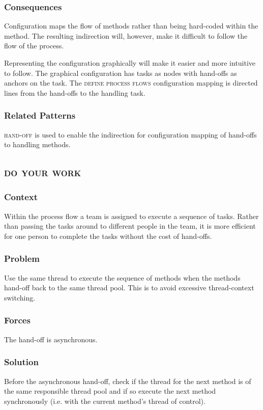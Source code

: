 \documentclass[prodmode]{style/acmlarge}
\begin{document}
\subsubsection*{Consequences} Configuration maps the flow of methods rather than
being hard-coded within the method. The resulting indirection will, however,
make it difficult to follow the flow of the process.  

Representing the configuration graphically will make it easier and more
intuitive to follow.  The graphical configuration has tasks as nodes with
hand-offs as anchors on the task.  The \textsc{define process flows}
configuration mapping is directed lines from the hand-offs to the handling task.

\subsubsection*{Related Patterns} \textsc{hand-off} is used to enable the
indirection for configuration mapping of hand-offs to handling methods.




\subsection{\textsc{\textbf{do your work}}}

\subsubsection*{Context} Within the process flow a team is assigned to execute a
sequence of tasks. Rather than passing the tasks around to different people in
the team, it is more efficient for one person to complete the tasks without the
cost of hand-offs.

\subsubsection*{Problem} Use the same thread to execute the sequence of methods
when the methods hand-off back to the same thread pool.  This is to avoid
excessive thread-context switching.

\subsubsection*{Forces} The hand-off is asynchronous.

\subsubsection*{Solution} Before the asynchronous hand-off, check if the thread
for the next method is of the same responsible thread pool and if so execute the
next method synchronously (i.e. with the current method's thread of control).
\end{document}
